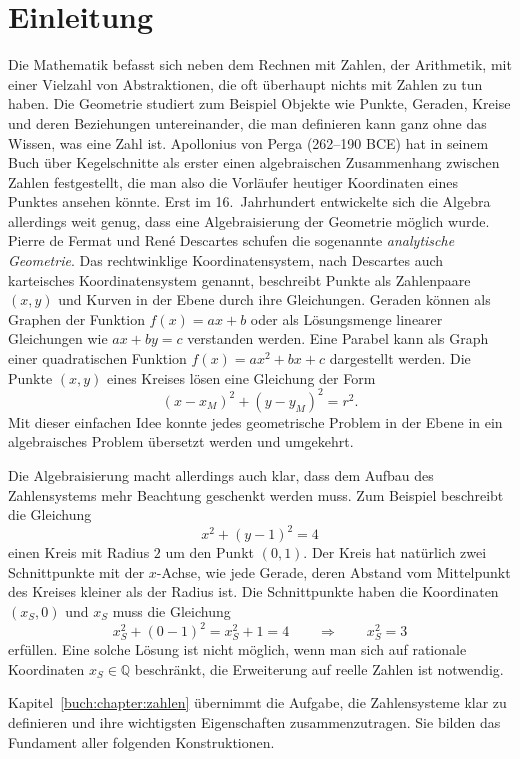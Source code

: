 %
%
%
\chapter*{Einleitung\label{chapter:einleitung}}
\rhead{}
Die Mathematik befasst sich neben dem Rechnen mit Zahlen, der Arithmetik,
mit einer Vielzahl von Abstraktionen, die oft überhaupt nichts mit 
Zahlen zu tun haben.
Die Geometrie studiert zum Beispiel Objekte wie Punkte, Geraden, Kreise
und deren Beziehungen untereinander, die man definieren kann ganz ohne
das Wissen, was eine Zahl ist.
Apollonius von Perga (262--190 BCE) hat in seinem Buch über Kegelschnitte
als erster einen algebraischen Zusammenhang zwischen Zahlen festgestellt,
die man also die Vorläufer heutiger Koordinaten eines Punktes ansehen könnte.
Erst im 16.~Jahrhundert entwickelte sich die Algebra allerdings weit genug,
dass eine Algebraisierung der Geometrie möglich wurde.
Pierre de Fermat
%
und René Descartes
%
schufen die sogenannte {\em analytische Geometrie}. 
Das rechtwinklige Koordinatensystem, nach Descartes auch karteisches
Koordinatensystem genannt, beschreibt Punkte als Zahlenpaare $(x,y)$
und Kurven in der Ebene durch ihre Gleichungen.
Geraden können als Graphen der Funktion $f(x) = ax+b$ oder als Lösungsmenge
linearer Gleichungen wie $ax+by=c$ verstanden werden.
Eine Parabel kann als Graph einer quadratischen Funktion $f(x)=ax^2+bx+c$
dargestellt werden.
Die Punkte $(x,y)$ eines Kreises lösen eine Gleichung der Form
\[
(x-x_M)^2 + (y-y_M)^2 = r^2.
\]
Mit dieser einfachen Idee konnte jedes geometrische Problem in der Ebene
in ein algebraisches Problem übersetzt werden und umgekehrt.

Die Algebraisierung macht allerdings auch klar, dass dem Aufbau des
Zahlensystems mehr Beachtung geschenkt werden muss.
Zum Beispiel beschreibt die Gleichung
\[
x^2+(y-1)^2=4
\]
einen Kreis mit Radius $2$ um den Punkt $(0,1)$.
Der Kreis hat natürlich zwei Schnittpunkte mit der $x$-Achse, wie jede
Gerade, deren Abstand vom Mittelpunkt des Kreises kleiner als der Radius
ist.
Die Schnittpunkte haben die Koordinaten $(x_S,0)$ und $x_S$ muss die
Gleichung
\[
x_S^2 + (0-1)^2 = x_S^2+1=4
\qquad\Rightarrow\qquad
x_S^2=3
\]
erfüllen.
Eine solche Lösung ist nicht möglich, wenn man sich auf rationale
Koordinaten $x_S\in\mathbb{Q}$ beschränkt, die Erweiterung auf
reelle Zahlen ist notwendig.

Kapitel~\ref{buch:chapter:zahlen} übernimmt die Aufgabe, die Zahlensysteme
klar zu definieren und ihre wichtigsten Eigenschaften zusammenzutragen.
Sie bilden das Fundament aller folgenden Konstruktionen.

